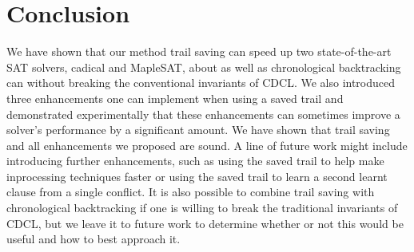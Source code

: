 \documentclass[runningheads]{llncs}
\newcommand{\sat}{SAT\xspace}
\begin{document}
\section{Conclusion}
We have shown that our method trail saving can speed up two
state-of-the-art \sat solvers, cadical and MapleSAT, about as well as
chronological backtracking can without breaking the conventional invariants
of CDCL. We also introduced three enhancements one can
implement when using a saved trail and demonstrated experimentally
that these enhancements can sometimes improve a solver's performance by a significant
amount. We have shown that trail saving and all enhancements we proposed are sound.
A line of future work might include introducing further enhancements,
such as using the saved trail to help make inprocessing techniques faster or
using the saved trail to learn a second learnt clause from a single conflict.
It is also possible to combine trail saving with chronological
backtracking if one is willing to break the traditional invariants of CDCL,
but we leave it to future work to determine whether or not this would be
useful and how to best approach it.




{}

\end{document}
